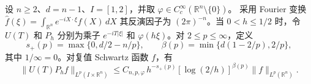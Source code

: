 设 \(n\ge2\)、\(d=n-1\)、\(I=[1,2]\)，并取 \(\varphi\in C_c^\infty(\mathbb R^n\setminus\{0\})\)。
采用 Fourier 变换
\(\widehat f(\xi)=\int_{\mathbb R^n} e^{-iX\cdot\xi}f(X)\,dX\)
其反演因子为 \((2\pi)^{-n}\)。当 \(0<h\le1/2\) 时，令 \(U(T)\) 和 \(P_h\) 分别为乘子 \(e^{-iT|\xi|}\) 和 \(\varphi(h\xi)\)。对 \(2\le p\le\infty\)，定义
\[
 s_+(p)=\max\{0,d/2-n/p\},\qquad
 \beta(p)=\min\{d(1-2/p),2/p\},
\]
其中 \(1/\infty=0\)。对复值 Schwartz 函数 \(f\)，有
\[
 \|U(T)P_hf\|_{L^p(I\times\mathbb R^n)}
 \le C_{n,p,\varphi}\,h^{-s_+(p)}[\log(2/h)]^{\beta(p)}
                 \|f\|_{L^p(\mathbb R^n)} .
\]
